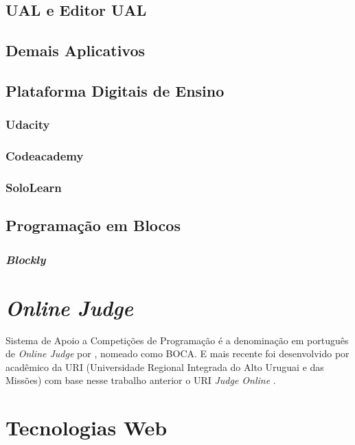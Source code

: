 \subsection{UAL e Editor UAL}

\subsection{Demais Aplicativos}

\subsection{Plataforma Digitais de Ensino}

\subsubsection{Udacity}

\subsubsection{Codeacademy}

\subsubsection{SoloLearn}

\subsection{Programação em Blocos}

\subsubsection{\textit{Blockly}}

\section{\textit{Online Judge}}

Sistema de Apoio a Competições de Programação é a denominação em português de
\textit{Online Judge} por , nomeado como BOCA.
E mais recente foi desenvolvido por acadêmico da URI (Universidade Regional
Integrada do Alto Uruguai e das Missões) com base nesse trabalho anterior o URI
\textit{Judge Online} \cite{tonin2013uri}.

\section{Tecnologias Web}

